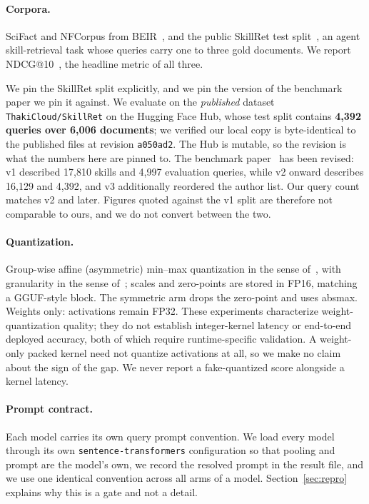 \documentclass[11pt]{article}
\begin{document}
\paragraph{Corpora.} SciFact and NFCorpus from BEIR~\cite{beir}, and the public SkillRet
test split~\cite{skillret}, an agent skill-retrieval task whose queries carry one to three
gold documents. We report NDCG@10~\cite{ndcg}, the headline metric of all three.

We pin the SkillRet split explicitly, and we pin the version of the benchmark paper we pin it
against. We evaluate on the \emph{published} dataset \texttt{ThakiCloud/SkillRet} on the
Hugging Face Hub, whose test split contains \textbf{4{,}392 queries over 6{,}006 documents};
we verified our local copy is byte-identical to the published files at revision
\texttt{a050ad2}. The Hub is mutable, so the revision is what the numbers here are pinned to. The benchmark
paper~\cite{skillret} has been revised: v1 described 17{,}810 skills and 4{,}997 evaluation
queries, while v2 onward describes 16{,}129 and 4{,}392, and v3 additionally reordered the
author list. Our query count matches v2 and later. Figures quoted against the v1 split are
therefore not comparable to ours, and we do not convert between the two.

\paragraph{Quantization.} Group-wise affine (asymmetric) min--max quantization in the sense
of~\cite{jacob}, with granularity in the sense of~\cite{krish}; scales and zero-points are
stored in FP16, matching a GGUF-style block. The symmetric arm drops the zero-point and uses
absmax. Weights only: activations remain FP32. These experiments characterize weight-quantization
quality; they do not establish integer-kernel latency or end-to-end deployed accuracy, both
of which require runtime-specific validation. A weight-only packed kernel need not quantize
activations at all, so we make no claim about the sign of the gap. We never report a
fake-quantized score alongside a kernel latency.

\paragraph{Prompt contract.} Each model carries its own query prompt convention. We load
every model through its own \texttt{sentence-transformers} configuration so that pooling and
prompt are the model's own, we record the resolved prompt in the result file, and we use one
identical convention across all arms of a model. Section~\ref{sec:repro} explains why this is
a gate and not a detail.
\end{document}

